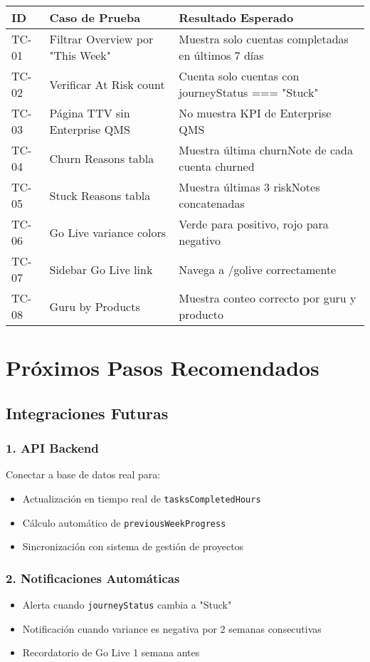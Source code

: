 \documentclass[12pt,a4paper]{article}
\begin{document}
\begin{longtable}{|p{2cm}|p{5cm}|p{6cm}|}
\hline
\textbf{ID} & \textbf{Caso de Prueba} & \textbf{Resultado Esperado} \\
\hline
\endhead
TC-01 & Filtrar Overview por "This Week" & Muestra solo cuentas completadas en últimos 7 días \\
\hline
TC-02 & Verificar At Risk count & Cuenta solo cuentas con journeyStatus === "Stuck" \\
\hline
TC-03 & Página TTV sin Enterprise QMS & No muestra KPI de Enterprise QMS \\
\hline
TC-04 & Churn Reasons tabla & Muestra última churnNote de cada cuenta churned \\
\hline
TC-05 & Stuck Reasons tabla & Muestra últimas 3 riskNotes concatenadas \\
\hline
TC-06 & Go Live variance colors & Verde para positivo, rojo para negativo \\
\hline
TC-07 & Sidebar Go Live link & Navega a /golive correctamente \\
\hline
TC-08 & Guru by Products & Muestra conteo correcto por guru y producto \\
\hline
\end{longtable}

\section{Próximos Pasos Recomendados}

\subsection{Integraciones Futuras}

\subsubsection{1. API Backend}
Conectar a base de datos real para:
\begin{itemize}
    \item Actualización en tiempo real de \texttt{tasksCompletedHours}
    \item Cálculo automático de \texttt{previousWeekProgress}
    \item Sincronización con sistema de gestión de proyectos
\end{itemize}

\subsubsection{2. Notificaciones Automáticas}
\begin{itemize}
    \item Alerta cuando \texttt{journeyStatus} cambia a "Stuck"
    \item Notificación cuando variance es negativa por 2 semanas consecutivas
    \item Recordatorio de Go Live 1 semana antes
\end{itemize}
\end{document}
